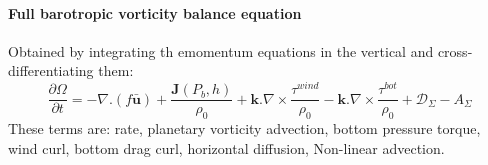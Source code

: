 \documentclass[..\Papers.tex]{subfiles}
\begin{document}
\paragraph{Full barotropic vorticity balance equation}
Obtained by integrating th emomentum equations in the vertical and cross-differentiating them:
\begin{equation}
    \frac{\partial \Omega}{\partial t} = - \nabla . (f\bar{\boldsymbol{u}}) + \frac{\boldsymbol{J}(P_b,h)}{\rho_0} + \boldsymbol{k}.\nabla\times\frac{\tau^{wind}}{\rho_0}-\boldsymbol{k}.\nabla\times\frac{\tau^{bot}}{\rho_0}+\mathcal{D}_\Sigma-A_\Sigma
\end{equation}
These terms are: rate, planetary vorticity advection, bottom pressure torque, wind curl, bottom drag curl, horizontal diffusion, Non-linear advection.
\end{document}

